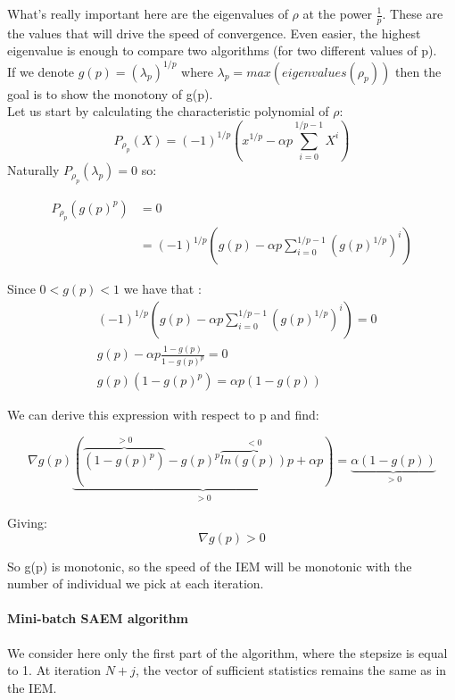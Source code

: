 \documentclass[a4paper]{article}
\theoremstyle{plain}
\theoremstyle{plain}
\theoremstyle{definition}
\begin{document}
What's really important here are the eigenvalues of $\rho$ at the power $\frac{1}{p}$. These are the values that will drive the speed of convergence. Even easier, the highest eigenvalue is enough to compare two algorithms (for two different values of p).\\
If we denote $g(p) = (\lambda_p)^{1/p}$ where $\lambda_p = max(eigenvalues(\rho_p))$ then the goal is to show the monotony of g(p).\\
Let us start by calculating the characteristic polynomial of $\rho$:
\begin{equation}
P_{\rho_p}(X) = (-1)^{1/p}(x^{1/p} - \alpha p \sum_{i=0}^{1/p-1}{X^i})
\end{equation}
Naturally $P_{\rho_p}(\lambda_p) = 0$ so:

\begin{equation}
\begin{split}
P_{\rho_p}(g(p)^p) & = 0\\
& = (-1)^{1/p}(g(p) - \alpha p \sum_{i=0}^{1/p-1}{(g(p)^{1/p})^i})
\end{split}
\end{equation}

Since $0 < g(p) < 1$ we have that :
\begin{equation}
\begin{split}
& (-1)^{1/p}(g(p) - \alpha p \sum_{i=0}^{1/p-1}{(g(p)^{1/p})^i}) = 0\\
& g(p) - \alpha p \frac{1 - g(p)}{1 - g(p)^p} = 0\\
& g(p)(1 - g(p)^p) = \alpha p (1 - g(p))
\end{split}
\end{equation}

We can derive this expression with respect to p and find:

\begin{equation}
\nabla g(p) \underbrace{(\overbrace{(1 - g(p)^p)}^{>0}- g(p)^p \overbrace{ln(g(p))}^{<0}p + \alpha p)}_{>0} = \underbrace{\alpha (1-g(p))}_{>0}
\end{equation}

Giving: 
\begin{equation}
\nabla g(p) > 0
\end{equation}

So g(p) is monotonic, so the speed of the IEM will be monotonic with the number of individual we pick at each iteration.

\paragraph{Mini-batch SAEM algorithm}
We consider here only the first part of the algorithm, where the stepsize is equal to 1.
At iteration $N+j$, the vector of sufficient statistics remains the same as in the IEM.
\end{document}
